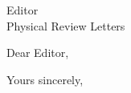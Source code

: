 \documentclass[a4paper,12pt]{letter}
\begin{document}
\begin{letter}{Editor\\Physical Review Letters}

\opening{Dear Editor,}


\closing{Yours sincerely,}

\vspace{1.5em}

\end{letter}
\end{document}
